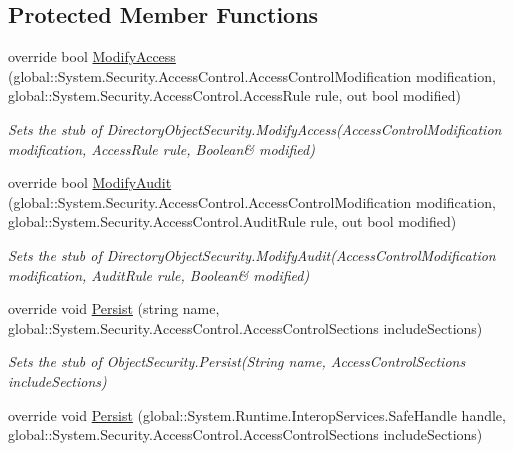 \subsection*{Protected Member Functions}
\begin{DoxyCompactItemize}
\item 
override bool \hyperlink{class_system_1_1_security_1_1_access_control_1_1_fakes_1_1_stub_directory_object_security_af9a88a7cd6d9ab199e2c1727f5bc33dc}{Modify\-Access} (global\-::\-System.\-Security.\-Access\-Control.\-Access\-Control\-Modification modification, global\-::\-System.\-Security.\-Access\-Control.\-Access\-Rule rule, out bool modified)
\begin{DoxyCompactList}\small\item\em Sets the stub of Directory\-Object\-Security.\-Modify\-Access(Access\-Control\-Modification modification, Access\-Rule rule, Boolean\& modified)\end{DoxyCompactList}\item 
override bool \hyperlink{class_system_1_1_security_1_1_access_control_1_1_fakes_1_1_stub_directory_object_security_a727c3a37ef51ef809c92ac5a21f9915e}{Modify\-Audit} (global\-::\-System.\-Security.\-Access\-Control.\-Access\-Control\-Modification modification, global\-::\-System.\-Security.\-Access\-Control.\-Audit\-Rule rule, out bool modified)
\begin{DoxyCompactList}\small\item\em Sets the stub of Directory\-Object\-Security.\-Modify\-Audit(Access\-Control\-Modification modification, Audit\-Rule rule, Boolean\& modified)\end{DoxyCompactList}\item 
override void \hyperlink{class_system_1_1_security_1_1_access_control_1_1_fakes_1_1_stub_directory_object_security_a3b78aaafbdfdb6ab48e08deb78092d98}{Persist} (string name, global\-::\-System.\-Security.\-Access\-Control.\-Access\-Control\-Sections include\-Sections)
\begin{DoxyCompactList}\small\item\em Sets the stub of Object\-Security.\-Persist(\-String name, Access\-Control\-Sections include\-Sections)\end{DoxyCompactList}\item 
override void \hyperlink{class_system_1_1_security_1_1_access_control_1_1_fakes_1_1_stub_directory_object_security_a6cf84f689afa295f5d127cf3614fea47}{Persist} (global\-::\-System.\-Runtime.\-Interop\-Services.\-Safe\-Handle handle, global\-::\-System.\-Security.\-Access\-Control.\-Access\-Control\-Sections include\-Sections)

\end{DoxyCompactItemize}

